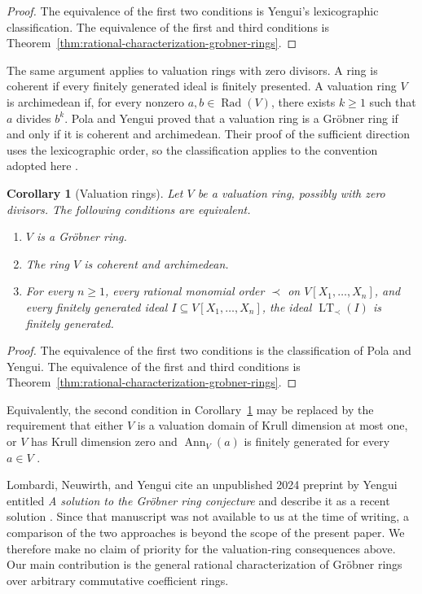 \documentclass[preprint,12pt,3p]{elsarticle}
\newtheorem{corollary}[theorem]{Corollary}
\theoremstyle{definition}
\theoremstyle{remark}
\newcommand{\LT}{\operatorname{LT}}
\begin{document}
	\begin{proof}
		The equivalence of the first two conditions is Yengui's lexicographic
		classification. The equivalence of the first and third conditions is
		Theorem~\ref{thm:rational-characterization-grobner-rings}.
	\end{proof}
	
	The same argument applies to valuation rings with zero divisors. A
	ring is coherent if every finitely generated ideal is finitely
	presented. A valuation ring $V$ is archimedean if, for every nonzero
	$a,b\in\operatorname{Rad}(V)$, there exists $k\geq 1$ such that
	$a$ divides $b^k$.
	Pola and Yengui proved that a valuation ring is a Gr\"obner ring if
	and only if it is coherent and archimedean. Their proof of the
	sufficient direction uses the lexicographic order, so the
	classification applies to the convention adopted here
	\cite{PolaYengui2014}.
	
	\begin{corollary}[Valuation rings]
		\label{cor:rational-orders-valuation-rings}
		Let $V$ be a valuation ring, possibly with zero divisors. The
		following conditions are equivalent.
		\begin{enumerate}
			\item $V$ is a Gr\"obner ring.
			\item The ring $V$ is coherent and archimedean.
			\item For every $n\geq 1$, every rational monomial order $\prec$ on
			$V[X_1,\ldots,X_n]$, and every finitely generated ideal
			$I\subseteq V[X_1,\ldots,X_n]$, the ideal $\LT_\prec(I)$ is finitely
			generated.
		\end{enumerate}
	\end{corollary}
	
	\begin{proof}
		The equivalence of the first two conditions is the classification of
		Pola and Yengui. The equivalence of the first and third conditions is
		Theorem~\ref{thm:rational-characterization-grobner-rings}.
	\end{proof}
	
	Equivalently, the second condition in
	Corollary~\ref{cor:rational-orders-valuation-rings} may be replaced by
	the requirement that either $V$ is a valuation domain of Krull
	dimension at most one, or $V$ has Krull dimension zero and
	$\operatorname{Ann}_V(a)$ is finitely generated for every $a\in V$
	\cite{PolaYengui2014}.
	
	Lombardi, Neuwirth, and Yengui cite an unpublished 2024 preprint by
	Yengui entitled \emph{A solution to the Gr\"obner ring conjecture}
	and describe it as a recent solution
	\cite{LombardiNeuwirthYengui2026}. Since that manuscript was not
	available to us at the time of writing, a comparison of the two
	approaches is beyond the scope of the present paper. We therefore
	make no claim of priority for the valuation-ring consequences above.
	Our main contribution is the general rational characterization of
	Gr\"obner rings over arbitrary commutative coefficient rings.
	
\end{document}
